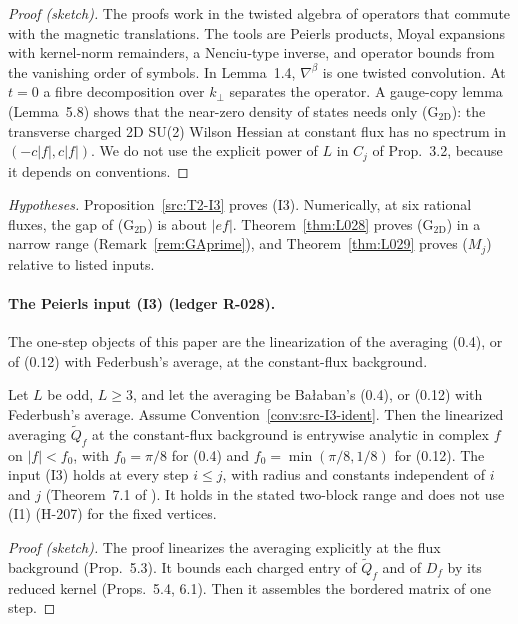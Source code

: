 \begin{proof}[Proof (sketch)]
The proofs work in the twisted algebra of operators that commute with the magnetic translations. The tools are Peierls products, Moyal expansions with kernel-norm remainders, a Nenciu-type inverse, and operator bounds from the vanishing order of symbols. In Lemma~1.4, $\nabla^\beta$ is one twisted convolution. At $t=0$ a fibre decomposition over $k_\perp$ separates the operator. A gauge-copy lemma (Lemma~5.8) shows that the near-zero density of states needs only (G$_{\mathrm{2D}}$): the transverse charged 2D SU(2) Wilson Hessian at constant flux has no spectrum in $(-c|f|,c|f|)$. We do not use the explicit power of $L$ in $C_j$ of Prop.~3.2, because it depends on conventions.
\end{proof}

\emph{Hypotheses.} Proposition~\ref{src:T2-I3} proves (I3). Numerically, at six rational fluxes, the gap of (G$_{\mathrm{2D}}$) is about $|ef|$. Theorem~\ref{thm:L028} proves (G$_{\mathrm{2D}}$) in a narrow range (Remark~\ref{rem:GAprime}), and Theorem~\ref{thm:L029} proves ($M_j$) relative to listed inputs.

\paragraph{The Peierls input (I3) (ledger R-028).}

\begin{convention}\label{conv:src-I3-ident}
The one-step objects of this paper are the linearization of the averaging (0.4), or of (0.12) with Federbush's average, at the constant-flux background.
\end{convention}

\begin{proposition}[(I3)]\label{src:T2-I3}
Let $L$ be odd, $L\ge3$, and let the averaging be Ba{\l}aban's (0.4), or (0.12) with Federbush's average. Assume Convention~\ref{conv:src-I3-ident}. Then the linearized averaging $\tilde Q_f$ at the constant-flux background is entrywise analytic in complex $f$ on $|f|<f_0$, with $f_0=\pi/8$ for (0.4) and $f_0=\min(\pi/8,1/8)$ for (0.12). The input (I3) holds at every step $i\le j$, with radius and constants independent of $i$ and $j$ (Theorem~7.1 of ). It holds in the stated two-block range and does not use (I1) (H-207) for the fixed vertices.
\end{proposition}

\begin{proof}[Proof (sketch)]
The proof linearizes the averaging explicitly at the flux background (Prop.~5.3). It bounds each charged entry of $\tilde Q_f$ and of $D_f$ by its reduced kernel (Props.~5.4, 6.1). Then it assembles the bordered matrix of one step.
\end{proof}

